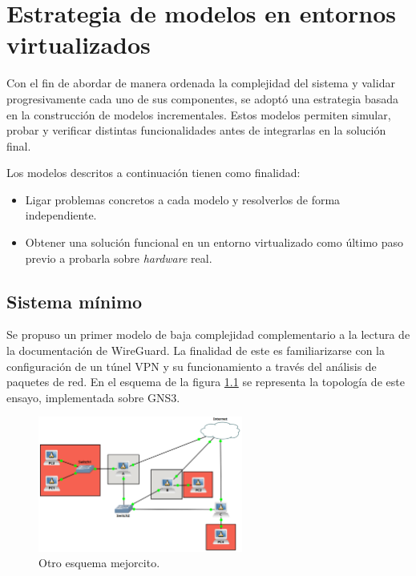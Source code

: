 \chapter{Estrategia de modelos en entornos virtualizados}

Con el fin de abordar de manera ordenada la complejidad del sistema y validar progresivamente cada uno de sus componentes, se adoptó una estrategia basada en la construcción de modelos incrementales. Estos modelos permiten simular, probar y verificar distintas funcionalidades antes de integrarlas en la solución final.

Los modelos descritos a continuación tienen como finalidad:
\begin{itemize}
    \item Ligar problemas concretos a cada modelo y resolverlos de forma independiente. %
    \item Obtener una solución funcional en un entorno virtualizado como último paso previo a probarla sobre \textit{hardware} real.
\end{itemize}


\section{Sistema mínimo}

Se propuso un primer modelo de baja complejidad complementario a la lectura de la documentación de WireGuard. La finalidad de este es familiarizarse con la configuración de un túnel VPN y su funcionamiento a través del análisis de paquetes de red. En el esquema de la figura \ref{diag:wg_minimal} se representa la topología de este ensayo, implementada sobre GNS3.

\begin{figure}[h!]
    \centering
    \includegraphics[width=0.6\textwidth]{../images/gns3_1.png}
    \caption{Otro esquema mejorcito.}
    \label{diag:wg_minimal}
\end{figure}

